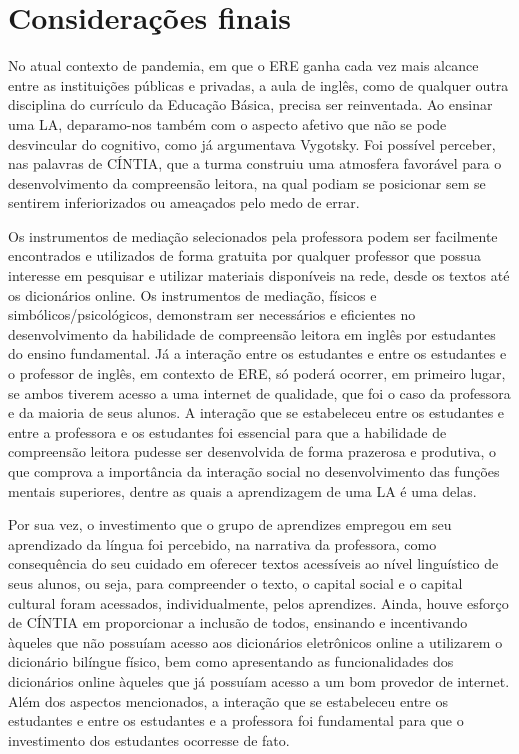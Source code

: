 \documentclass{textolivre}
\begin{document}
\section{Considerações finais}

No atual contexto de pandemia, em que o ERE ganha cada vez mais alcance entre as instituições públicas e privadas, a aula de inglês, como de qualquer outra disciplina do currículo da Educação Básica, precisa ser reinventada. Ao ensinar uma LA, deparamo-nos também com o aspecto afetivo que não se pode desvincular do cognitivo, como já argumentava Vygotsky. Foi possível perceber, nas palavras de CÍNTIA, que a turma construiu uma atmosfera favorável para o desenvolvimento da compreensão leitora, na qual podiam se posicionar sem se sentirem inferiorizados ou ameaçados pelo medo de errar.

Os instrumentos de mediação selecionados pela professora podem ser facilmente encontrados e utilizados de forma gratuita por qualquer professor que possua interesse em pesquisar e utilizar materiais disponíveis na rede, desde os textos até os dicionários online. Os instrumentos de mediação, físicos e simbólicos/psicológicos, demonstram ser necessários e eficientes no desenvolvimento da habilidade de compreensão leitora em inglês por estudantes do ensino fundamental. Já a interação entre os estudantes e entre os estudantes e o professor de inglês, em contexto de ERE, só poderá ocorrer, em primeiro lugar, se ambos tiverem acesso a uma internet de qualidade, que foi o caso da professora e da maioria de seus alunos. A interação que se estabeleceu entre os estudantes e entre a professora e os estudantes foi essencial para que a habilidade de compreensão leitora pudesse ser desenvolvida de forma prazerosa e produtiva, o que comprova a importância da interação social no desenvolvimento das funções mentais superiores, dentre as quais a aprendizagem de uma LA é uma delas.

Por sua vez, o investimento que o grupo de aprendizes empregou em seu aprendizado da língua foi percebido, na narrativa da professora, como consequência do seu cuidado em oferecer textos acessíveis ao nível linguístico de seus alunos, ou seja, para compreender o texto, o capital social e o capital cultural foram acessados, individualmente, pelos aprendizes. Ainda, houve esforço de CÍNTIA em proporcionar a inclusão de todos, ensinando e incentivando àqueles que não possuíam acesso aos dicionários eletrônicos online a utilizarem o dicionário bilíngue físico, bem como apresentando as funcionalidades dos dicionários online àqueles que já possuíam acesso a um bom provedor de internet. Além dos aspectos mencionados, a interação que se estabeleceu entre os estudantes e entre os estudantes e a professora foi fundamental para que o investimento dos estudantes ocorresse de fato.  
\end{document}
